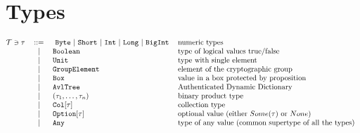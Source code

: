 \documentclass[11pt]{article}
\newcommand{\lst}[1]{\text{\lstinline[basicstyle={\ttfamily}]$#1$}}
\begin{document}
\section{Types}

\[\begin{tabular}{@{}l c l l}
      $\mathcal{T} \ni \tau$			& ::= 	    &\
         \lst{Byte} $\mid$ \lst{Short} $\mid$
         \lst{Int} $\mid$ \lst{Long} $\mid$ \lst{BigInt}  & numeric types     \\
      &	$\mid$	& \lst{Boolean} 			& type of logical values true/false   \\
      &	$\mid$	& \lst{Unit} 				& type with single element   \\
      &	$\mid$	& \lst{GroupElement} 		& element of the cryptographic group  \\
      &	$\mid$	& \lst{Box} 				& value in a box protected by proposition  \\
      &	$\mid$	& \lst{AvlTree} 			&  Authenticated Dynamic Dictionary \\
      &	$\mid$	& $(\tau_1, \dots, \tau_n) $	& binary product type  \\
      & $\mid$  & $\text{\lst{Col}}[\tau]$	& collection type       \\
      & $\mid$  & $\text{\lst{Option}}[\tau]$	& optional value (either $Some(\tau)$ or $None$)      \\
      & $\mid$  & \lst{Any}                     & type of any value (common supertype of all the types) \\
\end{tabular}\]
\end{document}
